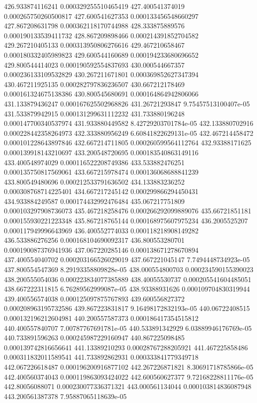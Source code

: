 {426.933874116241 0.000329255510465419
427.400541374019 0.000265750260500817
427.600541627353 0.000133456548660297
427.867208631798 0.000362118170744988
428.333875889576 0.000190133539411732
428.867209898466 0.000214391852704582
429.267210405133 0.000313950806276616
429.467210658467 0.000180332405989823
429.600544160689 0.000194233680696652
429.800544414023 0.000190592554837693
430.000544667357 0.000236133109532829
430.267211671801 0.000369852627347394
430.467211925135 0.000282797836236507
430.667212178469 0.000161324675138386
430.800545680691 0.000164864942806066
431.133879436247 0.000167625502968826
431.26721293847 9.75457513100407e-05
431.533879942915 0.000131299631112232
431.733880196248 0.000147700340537974
431.933880449582 8.42729203701784e-05
432.133880702916 0.000228442358264973
432.333880956249 6.60841822629131e-05
432.467214458472 0.000101228643897846
432.667214711805 0.000260599564112764
432.93388171625 0.000139918143210697
433.200548720695 0.000183540863149116
433.400548974029 0.000116522208749386
433.533882476251 0.000135750817569061
433.667215978474 0.000136068688841239
433.800549480696 0.000212533791636502
434.133883236252 0.000308768714225401
434.667217245142 0.000299866294450431
434.933884249587 0.000174432992476484
435.067217751809 0.000103297908736073
435.467218258476 0.000266292099889076
435.66721851181 0.000155930221223348
435.867218765144 0.000168975607975234
436.2005525207 0.000117949996643969
436.400552774033 0.000118218908149282
436.533886276256 0.000168104690092317
436.800553280701 0.000190087376941936
437.067220285146 0.000138671278670894
437.400554040702 0.000203166526029019
437.667221045147 7.7494448734923e-05
437.800554547369 8.29193358809828e-05
438.000554800703 0.000234590155390023
438.200555054036 0.000223834077385889
438.40055530737 0.000205541604485051
438.667222311815 6.76289562999087e-05
438.93388931626 0.000109704830319944
439.400556574038 0.000125097875767893
439.600556827372 0.000208963195732586
439.867223831817 9.16498172832193e-05
440.06722408515 0.000132196212604981
440.200557587373 0.000186417354515812
440.400557840707 7.00787767691781e-05
440.533891342929 6.03889946176769e-05
440.733891596263 0.000245987229160947
440.867225098485 0.000139742816656641
441.13389210293 0.00028767288205921
441.467225858486 0.000311832011589541
441.733892862931 0.000333841779349718
442.067226618487 0.000196200916877102
442.267226871821 8.30691718785866e-05
442.400560374043 0.000119863093424022
442.600560627377 9.72168228811176e-05
442.80056088071 0.000230077336371321
443.000561134044 0.000103814836087948
443.200561387378 7.95887065118639e-05
}
